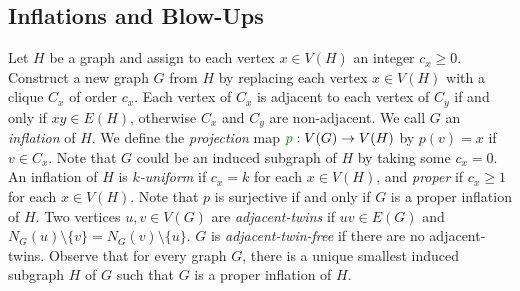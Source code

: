 \documentclass[11pt]{article}
\numberwithin{equation}{section}
\theoremstyle{plain}
\theoremstyle{definition}
\renewcommand{\geq}{\geqslant}
\newcommand{\defn}[1]{\textcolor{green!50!black}{\textit{#1}}}
\newcommand{\mathdefn}[1]{\textcolor{green!50!black}{#1}}
\begin{document}
\hfill
\begin{minipage}{0.57\textwidth}
    \centering
    \label{fig:equiv}
\end{minipage}

\subsection{Inflations and Blow-Ups}
\label{ss:inflations}
Let $H$ be a graph and assign to each vertex $x \in V(H)$ an integer $c_x \geq 0$. Construct a new graph $G$ from $H$ by replacing each vertex $x \in V(H)$ with a clique $C_x$ of order $c_x$. Each vertex of $C_x$ is adjacent to each vertex of $C_y$ if and only if $xy \in E(H)$, otherwise $C_x$ and $C_y$ are non-adjacent. We call $G$ an \defn{inflation} of $H$. We define the \defn{projection} map $\mathdefn{p}: V(G) \to V(H)$ by $p(v) = x$ if $v \in C_x$. Note that $G$ could be an induced subgraph of $H$ by taking some $c_x = 0$. An inflation of $H$ is \defn{$k$-uniform} if $c_x = k$ for each $x \in V(H)$, and \defn{proper} if $c_x \geq 1$ for each $x \in V(H)$. Note that $p$ is surjective if and only if $G$ is a proper inflation of $H$.
Two vertices $u, v \in V(G)$ are \defn{adjacent-twins} if $uv \in E(G)$ and $N_G(u) \setminus \{v\} = N_G(v) \setminus \{u\}$. $G$ is \defn{adjacent-twin-free} if there are no adjacent-twins.
Observe that for every graph $G$, there is a unique smallest induced subgraph $H$ of $G$ such that $G$ is a proper inflation of $H$.
\end{document}
